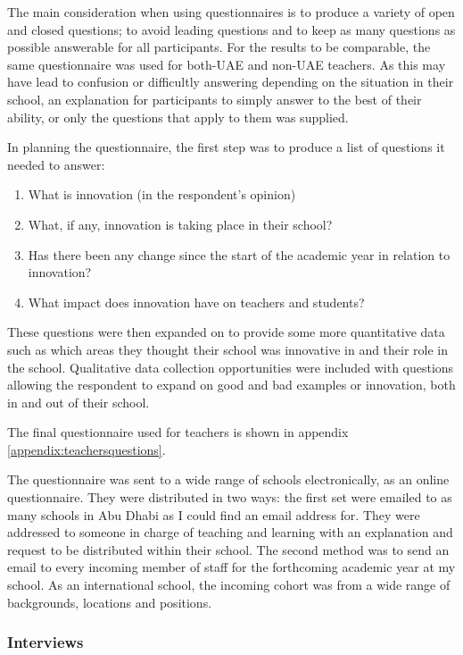 The main consideration when using questionnaires is to produce a variety of open and closed questions; to avoid leading questions and to keep as many questions as possible answerable for all participants. For the results to be comparable, the same questionnaire was used for both-UAE and non-UAE teachers.  As this may have lead to confusion or difficultly answering depending on the situation in their school, an explanation for participants to simply answer to the best of their ability, or only the questions that apply to them was supplied.

In planning the questionnaire, the first step was to produce a list of questions it needed to answer:

\begin{enumerate}
\item What is innovation (in the respondent's opinion)
\item What, if any, innovation is taking place in their school?
\item Has there been any change since the start of the academic year in relation to innovation?
\item What impact does innovation have on teachers and students?
\end{enumerate}

These questions were then expanded on to provide some more quantitative data such as which areas they thought their school was innovative in and their role in the school. Qualitative data collection opportunities were included with questions allowing the respondent to expand on good and bad examples or innovation, both in and out of their school.

The final questionnaire used for teachers is shown in appendix \ref{appendix:teachersquestions}.

The questionnaire was sent to a wide range of schools electronically, as an online questionnaire. They were distributed in two ways: the first set were emailed to as many schools in Abu Dhabi as I could find an email address for. They were addressed to someone in charge of teaching and learning with an explanation and request to be distributed within their school. The second method was to send an email to every incoming member of staff for the forthcoming academic year at my school. As an international school, the incoming cohort was from a wide range of backgrounds, locations and positions.

\subsubsection{Interviews}


